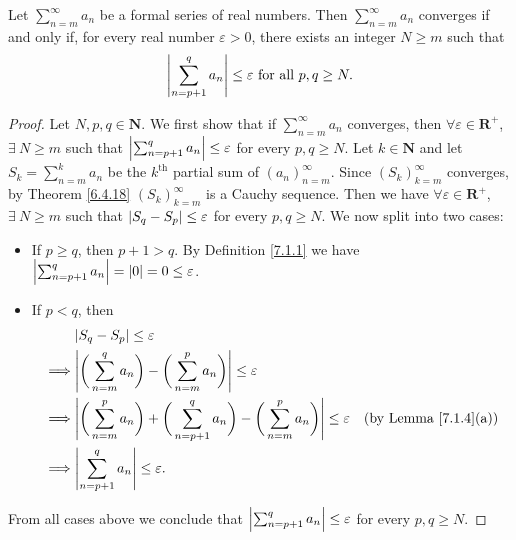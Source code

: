 \setcounter{theorem}{4}
\begin{proposition}\label{7.2.5}
    Let \(\sum_{n = m}^\infty a_n\) be a formal series of real numbers.
    Then \(\sum_{n = m}^\infty a_n\) converges if and only if, for every real number \(\varepsilon > 0\), there exists an integer \(N \geq m\) such that
    \[
        \abs*{\sum_{n = p + 1}^q a_n} \leq \varepsilon \text{ for all } p, q \geq N.
    \]
\end{proposition}

\begin{proof}
    Let \(N, p, q \in \mathbf{N}\).
    We first show that if \(\sum_{n = m}^\infty a_n\) converges, then \(\forall \varepsilon \in \mathbf{R}^+\), \(\exists\ N \geq m\) such that \(\abs*{\sum_{n = p + 1}^q a_n} \leq \varepsilon\) for every \(p, q \geq N\).
    Let \(k \in \mathbf{N}\) and let \(S_k = \sum_{n = m}^k a_n\) be the \(k^{\text{th}}\) partial sum of \((a_n)_{n = m}^\infty\).
    Since \((S_k)_{k = m}^\infty\) converges, by Theorem \ref{6.4.18} \((S_k)_{k = m}^\infty\) is a Cauchy sequence.
    Then we have \(\forall \varepsilon \in \mathbf{R}^+\), \(\exists\ N \geq m\) such that \(\abs*{S_q - S_p} \leq \varepsilon\) for every \(p, q \geq N\).
    We now split into two cases:
    \begin{itemize}
        \item If \(p \geq q\), then \(p + 1 > q\).
              By Definition \ref{7.1.1} we have \(\abs*{\sum_{n = p + 1}^q a_n} = \abs*{0} = 0 \leq \varepsilon\).
        \item If \(p < q\), then
              \begin{align*}
                           & \abs*{S_q - S_p} \leq \varepsilon                                                                                                                               \\
                  \implies & \abs*{\bigg(\sum_{n = m}^q a_n\bigg) - \bigg(\sum_{n = m}^p a_n\bigg)} \leq \varepsilon                                                                         \\
                  \implies & \abs*{\bigg(\sum_{n = m}^p a_n\bigg) + \bigg(\sum_{n = p + 1}^q a_n\bigg) - \bigg(\sum_{n = m}^p a_n\bigg)} \leq \varepsilon & \text{(by Lemma \ref{7.1.4}(a))} \\
                  \implies & \abs*{\sum_{n = p + 1}^q a_n} \leq \varepsilon.
              \end{align*}
    \end{itemize}
    From all cases above we conclude that \(\abs*{\sum_{n = p + 1}^q a_n} \leq \varepsilon\) for every \(p, q \geq N\).


\end{proof}
